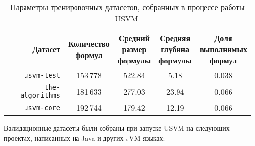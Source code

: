 \begin{table}[ht]
\begin{center}
\begin{tabular}{r|cccc}
    Датасет & \makecell{Количество \\ формул} & \makecell{Средний \\ размер \\ формулы} & \makecell{Средняя \\ глубина \\ формулы} & \makecell{Доля \\ выполнимых \\ формул} \\
    \hline \hline
    \rule{0pt}{2.5ex}
    \texttt{usvm-test} & 153\,778 & 522.84 & 5.18 & 0.038 \\
    \texttt{the-algorithms} & 181\,633 & 277.03 & 23.94 & 0.066 \\
    \texttt{usvm-core} & 192\,744 & 179.42 & 12.19 & 0.066 \\
\end{tabular}
\caption{\label{usvm-train-datasets-table} Параметры тренировочных датасетов, собранных в процессе работы USVM.}
\end{center}
\end{table}

Валидационные датасеты были собраны при запуске USVM на следующих проектах, написанных на Java и других JVM-языках:

